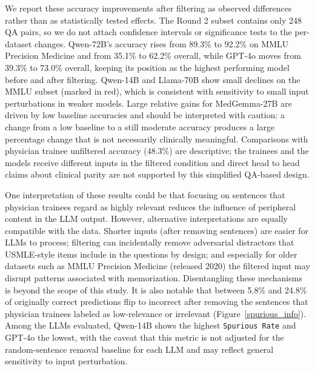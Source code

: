 \documentclass[fleqn,10pt]{wlscirep}
\def\ourmetric{\texttt{Spurious Rate}\xspace}
\begin{document}
We report these accuracy improvements after filtering as observed differences rather than as statistically tested effects. The Round 2 subset contains only 248 QA pairs, so we do not attach confidence intervals or significance tests to the per-dataset changes. Qwen-72B's accuracy rises from 89.3\% to 92.2\% on MMLU Precision Medicine and from 35.1\% to 62.2\% overall, while GPT-4o moves from 39.3\% to 73.0\% overall, keeping its position as the highest performing model before and after filtering. Qwen-14B and Llama-70B show small declines on the MMLU subset (marked in red), which is consistent with sensitivity to small input perturbations in weaker models. Large relative gains for MedGemma-27B are driven by low baseline accuracies and should be interpreted with caution: a change from a low baseline to a still moderate accuracy produces a large percentage change that is not necessarily clinically meaningful. Comparisons with physician trainee unfiltered accuracy (48.3\%) are descriptive; the trainees and the models receive different inputs in the filtered condition and direct head to head claims about clinical parity are not supported by this simplified QA-based design.




One interpretation of these results could be that focusing on sentences that physician trainees regard as highly relevant reduces the influence of peripheral content in the LLM output. However, alternative interpretations are equally compatible with the data. Shorter inputs (after removing sentences) are easier for LLMs to process; filtering can incidentally remove adversarial distractors that USMLE-style items include in the questions by design; and especially for older datasets such as MMLU Precision Medicine (released 2020) the filtered input may disrupt patterns associated with memorization. Disentangling these mechanisms is beyond the scope of this study. It is also notable that between 5.8\% and 24.8\% of originally correct predictions flip to incorrect after removing the sentences that physician trainees labeled as low-relevance or irrelevant (Figure~\ref{spurious_info}). Among the LLMs evaluated, Qwen-14B shows the highest \ourmetric and GPT-4o the lowest, with the caveat that this metric is not adjusted for the random-sentence removal baseline for each LLM and may reflect general sensitivity to input perturbation.
\end{document}
